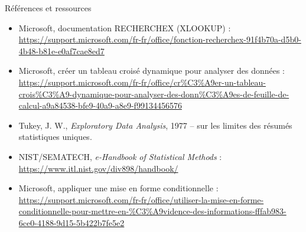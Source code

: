 \documentclass[aspectratio=169]{beamer}
\begin{document}
\begin{frame}{Références et ressources}
  \tiny
  \begin{itemize}
    \item Microsoft, documentation RECHERCHEX (XLOOKUP) : \url{https://support.microsoft.com/fr-fr/office/fonction-recherchex-91f4b70a-d5b0-4b48-b81e-e0af7cae8ed7}
    \item Microsoft, créer un tableau croisé dynamique pour analyser des données : \url{https://support.microsoft.com/fr-fr/office/cr%C3%A9er-un-tableau-crois%C3%A9-dynamique-pour-analyser-des-donn%C3%A9es-de-feuille-de-calcul-a9a84538-bfe9-40a9-a8e9-f99134456576}
    \item Tukey, J. W., \emph{Exploratory Data Analysis}, 1977 -- sur les limites des résumés statistiques uniques.
    \item NIST/SEMATECH, \emph{e-Handbook of Statistical Methods} : \url{https://www.itl.nist.gov/div898/handbook/}
    \item Microsoft, appliquer une mise en forme conditionnelle : \url{https://support.microsoft.com/fr-fr/office/utiliser-la-mise-en-forme-conditionnelle-pour-mettre-en-%C3%A9vidence-des-informations-fffab983-6ce0-4188-9d15-5b422b7fe5e2}
  \end{itemize}
\end{frame}
\end{document}
